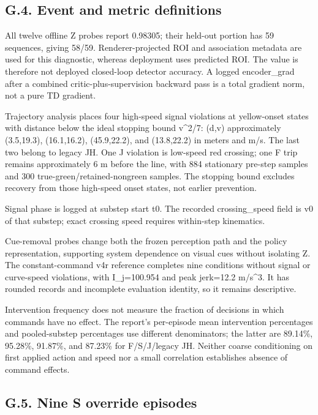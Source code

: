 \documentclass[letterpaper,journal,onecolumn]{IEEEtran}
\begin{document}
\subsection*{G.4. Event and metric definitions}

All twelve offline Z probes report 0.98305; their held-out portion has 59 sequences, giving 58/59. Renderer-projected ROI and association metadata are used for this diagnostic, whereas deployment uses predicted ROI. The value is therefore not deployed closed-loop detector accuracy. A logged encoder\_grad after a combined critic-plus-supervision backward pass is a total gradient norm, not a pure TD gradient.

Trajectory analysis places four high-speed signal violations at yellow-onset states with distance below the ideal stopping bound v\^{}2/7: (d,v) approximately (3.5,19.3), (16.1,16.2), (45.9,22.2), and (13.8,22.2) in meters and m/s. The last two belong to legacy JH. One J violation is low-speed red crossing; one F trip remains approximately 6 m before the line, with 884 stationary pre-step samples and 300 true-green/retained-nongreen samples. The stopping bound excludes recovery from those high-speed onset states, not earlier prevention.

Signal phase is logged at substep start t0. The recorded crossing\_speed field is v0 of that substep; exact crossing speed requires within-step kinematics.

Cue-removal probes change both the frozen perception path and the policy representation, supporting system dependence on visual cues without isolating Z. The constant-command v4r reference completes nine conditions without signal or curve-speed violations, with I\_j=100.954 and peak jerk=12.2 m/s\^{}3. It has rounded records and incomplete evaluation identity, so it remains descriptive.

Intervention frequency does not measure the fraction of decisions in which commands have no effect. The report's per-episode mean intervention percentages and pooled-substep percentages use different denominators; the latter are 89.14\%, 95.28\%, 91.87\%, and 87.23\% for F/S/J/legacy JH. Neither coarse conditioning on first applied action and speed nor a small correlation establishes absence of command effects.

\subsection*{G.5. Nine S override episodes}
\end{document}

